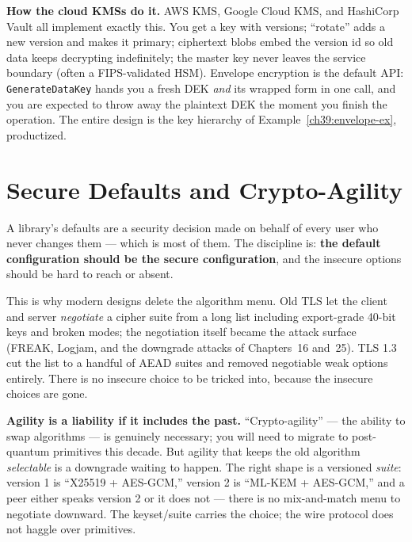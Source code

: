 \begin{applicationbox}
\textbf{How the cloud KMSs do it.} AWS KMS, Google Cloud KMS, and HashiCorp Vault
all implement exactly this. You get a key with versions; ``rotate'' adds a new
version and makes it primary; ciphertext blobs embed the version id so old data
keeps decrypting indefinitely; the master key never leaves the service boundary
(often a FIPS-validated HSM). Envelope encryption is the default API:
\texttt{GenerateDataKey} hands you a fresh DEK \emph{and} its wrapped form in one
call, and you are expected to throw away the plaintext DEK the moment you finish
the operation. The entire design is the key hierarchy of
Example~\ref{ch39:envelope-ex}, productized.
\end{applicationbox}

\section{Secure Defaults and Crypto-Agility}
\label{ch39:defaults}

A library's defaults are a security decision made on behalf of every user who never
changes them --- which is most of them. The discipline is: \textbf{the default
configuration should be the secure configuration}, and the insecure options should
be hard to reach or absent.

This is why modern designs delete the algorithm menu. Old TLS let the client and
server \emph{negotiate} a cipher suite from a long list including export-grade
40-bit keys and broken modes; the negotiation itself became the attack surface
(FREAK, Logjam, and the downgrade attacks of Chapters~16 and~25). TLS 1.3 cut the list to a handful of AEAD suites and removed negotiable
weak options entirely. There is no insecure choice to be tricked into, because the
insecure choices are gone.

\begin{trapbox}
\textbf{Agility is a liability if it includes the past.} ``Crypto-agility'' --- the
ability to swap algorithms --- is genuinely necessary; you will need to migrate to
post-quantum primitives this decade. But agility that keeps the old algorithm
\emph{selectable} is a downgrade waiting to happen. The right shape is a versioned
\emph{suite}: version 1 is ``X25519 + AES-GCM,'' version 2 is ``ML-KEM + AES-GCM,''
and a peer either speaks version 2 or it does not --- there is no mix-and-match menu
to negotiate downward. The keyset/suite carries the choice; the wire protocol does
not haggle over primitives.
\end{trapbox}

